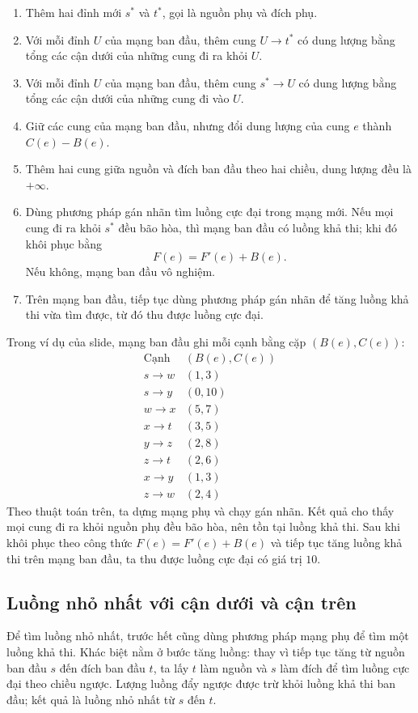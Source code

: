 \documentclass[11pt]{article}
\begin{document}
\begin{enumerate}
  \item Thêm hai đỉnh mới $s^*$ và $t^*$, gọi là nguồn phụ và đích phụ.
  \item Với mỗi đỉnh $U$ của mạng ban đầu, thêm cung $U\to t^*$ có dung lượng
  bằng tổng các cận dưới của những cung đi ra khỏi $U$.
  \item Với mỗi đỉnh $U$ của mạng ban đầu, thêm cung $s^*\to U$ có dung lượng
  bằng tổng các cận dưới của những cung đi vào $U$.
  \item Giữ các cung của mạng ban đầu, nhưng đổi dung lượng của cung $e$ thành
  $C(e)-B(e)$.
  \item Thêm hai cung giữa nguồn và đích ban đầu theo hai chiều, dung lượng
  đều là $+\infty$.
  \item Dùng phương pháp gán nhãn tìm luồng cực đại trong mạng mới. Nếu mọi
  cung đi ra khỏi $s^*$ đều bão hòa, thì mạng ban đầu có luồng khả thi; khi đó
  khôi phục bằng
  \[
    F(e)=F'(e)+B(e).
  \]
  Nếu không, mạng ban đầu vô nghiệm.
  \item Trên mạng ban đầu, tiếp tục dùng phương pháp gán nhãn để tăng luồng
  khả thi vừa tìm được, từ đó thu được luồng cực đại.
\end{enumerate}

Trong ví dụ của slide, mạng ban đầu ghi mỗi cạnh bằng cặp $(B(e),C(e))$:
\[
\begin{array}{c|c}
\text{Cạnh} & (B(e),C(e))\\ \hline
s\to w & (1,3)\\
s\to y & (0,10)\\
w\to x & (5,7)\\
x\to t & (3,5)\\
y\to z & (2,8)\\
z\to t & (2,6)\\
x\to y & (1,3)\\
z\to w & (2,4)
\end{array}
\]
Theo thuật toán trên, ta dựng mạng phụ và chạy gán nhãn. Kết quả cho thấy mọi
cung đi ra khỏi nguồn phụ đều bão hòa, nên tồn tại luồng khả thi. Sau khi khôi
phục theo công thức $F(e)=F'(e)+B(e)$ và tiếp tục tăng luồng khả thi trên mạng
ban đầu, ta thu được luồng cực đại có giá trị $10$.

\subsection{Luồng nhỏ nhất với cận dưới và cận trên}

Để tìm luồng nhỏ nhất, trước hết cũng dùng phương pháp mạng phụ để tìm một
luồng khả thi. Khác biệt nằm ở bước tăng luồng: thay vì tiếp tục tăng từ
nguồn ban đầu $s$ đến đích ban đầu $t$, ta lấy $t$ làm nguồn và $s$ làm đích
để tìm luồng cực đại theo chiều ngược. Lượng luồng đẩy ngược được trừ khỏi
luồng khả thi ban đầu; kết quả là luồng nhỏ nhất từ $s$ đến $t$.
\end{document}
